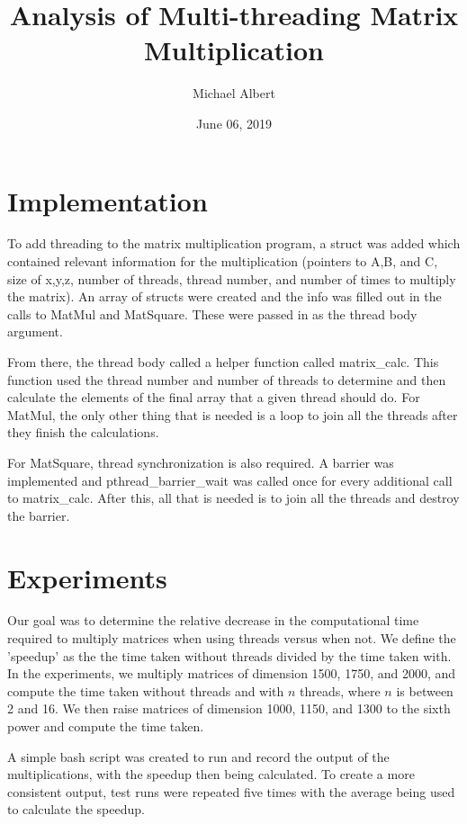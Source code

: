 \documentclass[11pt]{article} %
\begin{document}
\title{Analysis of Multi-threading Matrix Multiplication}
\author{Michael Albert}
\date{June 06, 2019}
\maketitle

\section*{Implementation}
To add threading to the matrix multiplication program, a struct was added which contained relevant information for the multiplication (pointers to A,B, and C, size of x,y,z, number of threads, thread number, and number of times to multiply the matrix). An array of structs were created and the info was filled out in the calls to MatMul and MatSquare. These were passed in as the thread body argument.

From there, the thread body called a helper function called matrix\_calc. This function used the thread number and number of threads to determine and then calculate the elements of the final array that a given thread should do. For MatMul, the only other thing that is needed is a loop to join all the threads after they finish the calculations.

For MatSquare, thread synchronization is also required. A barrier was implemented and pthread\_barrier\_wait was called once for every additional call to matrix\_calc. After this, all that is needed is to join all the threads and destroy the barrier.

\section*{Experiments}
Our goal was to determine the relative decrease in the computational time required to multiply matrices when using threads versus when not. We define the 'speedup' as the the time taken without threads divided by the time taken with. In the experiments, we multiply matrices of dimension 1500, 1750, and 2000, and compute the time taken without threads and with $n$ threads, where $n$ is between 2 and 16. We then raise matrices of dimension 1000, 1150, and 1300 to the sixth power and compute the time taken.

A simple bash script was created to run and record the output of the multiplications, with the speedup then being calculated. To create a more consistent output, test runs were repeated five times with the average being used to calculate the speedup. 
\end{document}
